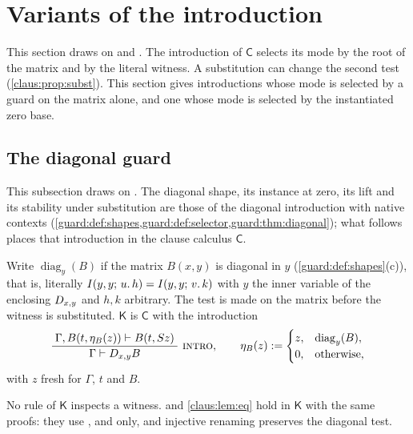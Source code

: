 \section{Variants of the introduction}
\label{claus:sec:intro}

This section draws on  and .
The introduction of $\mathsf{C}$ selects its mode by the root of the matrix
and by the literal witness. A substitution can change the second test
(\cref{claus:prop:subst}). This section gives introductions whose mode is
selected by a guard on the matrix alone, and one whose mode is selected by
the instantiated zero base.

\subsection{The diagonal guard}
\label{claus:sec:diagonal}

This subsection draws on . The diagonal shape, its
instance at zero, its lift and its stability under substitution are those
of the diagonal introduction with native contexts
(\cref{guard:def:shapes,guard:def:selector,guard:thm:diagonal}); what
follows places that introduction in the clause calculus $\mathsf{C}$.

\begin{definition}
\label{claus:def:k}
Write $\operatorname{diag}_y(B)$ if the matrix $B(x,y)$ is diagonal in $y$
(\cref{guard:def:shapes}(c)), that is, literally
$I(y,y;\,u.\,h)=I(y,y;\,v.\,k)$ with $y$ the inner variable of the
enclosing $D_{x,y}$ and $h,k$ arbitrary. The test is made on the
matrix before the witness is substituted. $\mathsf{K}$ is $\mathsf{C}$ with
the introduction
\[
 \infrule{\Gamma,B(t,\eta_B(z))\proves B(t,\Suc z)}
         {\Gamma\proves\D{x}{y}B}\ \rulename{Intro},
 \qquad
 \eta_B(z)\defeq
 \begin{cases}
 z,&\operatorname{diag}_y(B),\\
 0,&\text{otherwise,}
 \end{cases}
\]
with $z$ fresh for $\Gamma$, $t$ and $B$.
\end{definition}

No rule of $\mathsf{K}$ inspects a witness.  and
\cref{claus:lem:eq} hold in
$\mathsf{K}$ with the same proofs: they use ,
 and  only, and injective renaming preserves
the diagonal test.

